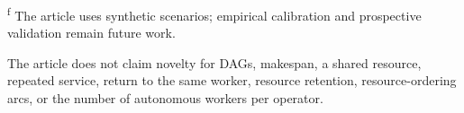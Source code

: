 \begin{landscape}
\begin{table}[!ht]
\begin{minipage}{0.97\linewidth}
\textsuperscript{f} The article uses synthetic scenarios; empirical calibration
and prospective validation remain future work.

\medskip
The article does not claim novelty for DAGs, makespan, a shared resource,
repeated service, return to the same worker, resource retention,
resource-ordering arcs, or the number of autonomous workers per operator.
\end{minipage}
\end{table}
\end{landscape}
\FloatBarrier
